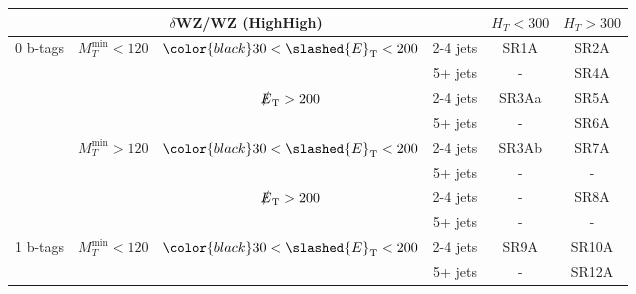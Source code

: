 \documentclass[plain,landscape]{article}
\newcommand{\met}{\slashed{E}_\mathrm{T}}
\begin{document}
\begin{table}
\renewcommand{\arraystretch}{1.3}
\centering
\begin{tabular}{|c|c|c|c|c|c|}
\hline
\multicolumn{4}{|c|}{ $\delta$WZ/WZ \textbf{(HighHigh)} }                      & $H_T < 300$ & $ H_T > 300$  \\ \hline
\multirow{8}{*}{0 b-tags}    & \multirow{4}{*}{$M_T^{\textrm{min}} < 120$} & \multirow{2}{*}{ ${\color{black} 30} < \met < 200$} & 2-4 jets    & SR1A                    & SR2A \\ \cline{4-6}
                             &                                             &                                              & 5+ jets     & -                       & SR4A  \\ \cline{3-6}
                             &                                             & \multirow{2}{*}{$\met > 200$}                & 2-4 jets    & SR3Aa                   & SR5A  \\ \cline{4-6}
                             &                                             &                                              & 5+ jets     & -                       & SR6A   \\ \cline{2-6}
                             & \multirow{4}{*}{$M_T^{\textrm{min}} > 120$} & \multirow{2}{*}{ ${\color{black} 30} < \met < 200$} & 2-4 jets    & SR3Ab                   & SR7A  \\ \cline{4-6}
                             &                                             &                                              & 5+ jets     & -                       & - \\ \cline{3-6}
                             &                                             & \multirow{2}{*}{$\met > 200$}                & 2-4 jets    & -                       & SR8A   \\ \cline{4-6}
                             &                                             &                                              & 5+ jets     & -                       & - \\ \cline{1-6}
\multirow{8}{*}{1 b-tags}    & \multirow{4}{*}{$M_T^{\textrm{min}} < 120$} & \multirow{2}{*}{ ${\color{black} 30} < \met < 200$} & 2-4 jets    & SR9A                    & SR10A  \\ \cline{4-6}
                             &                                             &                                              & 5+ jets     & -                       & SR12A  \\ \cline{3-6}

\end{tabular}
\end{table}
\end{document}
